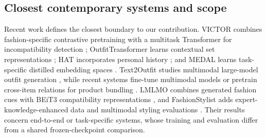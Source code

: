 \documentclass[pdflatex,sn-mathphys-num,iicol]{sn-jnl}
\begin{document}
\subsection{Closest contemporary systems and scope}

Recent work defines the closest boundary to our contribution. VICTOR combines fashion-specific contrastive pretraining with a multitask Transformer for incompatibility detection \cite{papadopoulos2023victor}; OutfitTransformer learns contextual set representations \cite{sarkar2023outfittransformer}; HAT incorporates personal history \cite{jung2025hat}; and MEDAL learns task-specific distilled embedding spaces \cite{sanny2026medal}. Text2Outfit studies multimodal large-model outfit generation \cite{zhai2025text2outfit}, while recent systems fine-tune multimodal models or pretrain cross-item relations for product bundling \cite{liu2025bundlemllm,ma2024cirp}. LMLMO combines generated fashion cues with BEiT3 compatibility representations \cite{chang2025large}, and FashionStylist adds expert-knowledge-enhanced data and multimodal styling evaluations \cite{feng2026fashionstylist}. Their results concern end-to-end or task-specific systems, whose training and evaluation differ from a shared frozen-checkpoint comparison.
\end{document}
